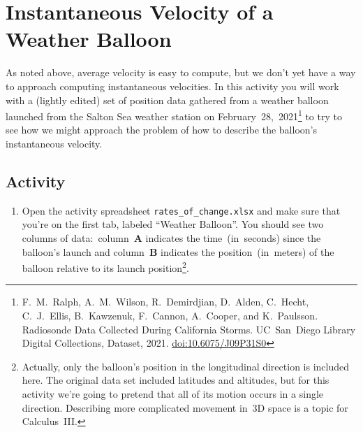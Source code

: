 \newpage
\section{Instantaneous Velocity of a Weather Balloon}
\label{sec:balloon}

As noted above, average velocity is easy to compute, but we don't yet have a way to approach computing instantaneous velocities. In this activity you will work with a (lightly edited) set of position data gathered from a weather balloon launched from the Salton Sea weather station on February~28,~2021\footnote{F.~M.~Ralph, A.~M.~Wilson, R.~Demirdjian, D.~Alden, C.~Hecht, C.~J.~Ellis, B.~Kawzenuk, F.~Cannon, A.~Cooper, and K.~Paulsson. Radiosonde Data Collected During California Storms. UC~San~Diego Library Digital Collections, Dataset, 2021. \href{https://doi.org/10.6075/J09P31S0}{doi:10.6075/J09P31S0}} to try to see how we might approach the problem of how to describe the balloon's instantaneous velocity.

\subsection*{Activity}

\begin{enumerate}[\bf {\thesection}a.]
	\item Open the activity spreadsheet \verb|rates_of_change.xlsx| and make sure that you're on the first tab, labeled ``Weather Balloon''. You should see two columns of data:~column~\textbf{A} indicates the time~(in~seconds) since the balloon's launch and column~\textbf{B} indicates the position~(in~meters) of the balloon relative to its launch position\footnote{Actually, only the balloon's position in the longitudinal direction is included here. The original data set included latitudes and altitudes, but for this activity we're going to pretend that all of its motion occurs in a single direction. Describing more complicated movement in~3D space is a topic for Calculus~III.}.
\end{enumerate}









